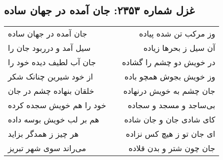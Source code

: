 \begin{center}
\section*{غزل شماره ۲۳۵۳: جان آمده در جهان ساده}
\label{sec:2353}
\begin{longtable}{l p{0.5cm} r}
جان آمده در جهان ساده
&&
وز مرکب تن شده پیاده
\\
سیل آمد و درربود جان را
&&
آن سیل ز بحرها زیاده
\\
جان آب لطیف دیده خود را
&&
در خویش دو چشم را گشاده
\\
از خود شیرین چنانک شکر
&&
وز خویش بجوش همچو باده
\\
خلقان بنهاده چشم در جان
&&
جان چشم به خویش درنهاده
\\
خود را هم خویش سجده کرده
&&
بی‌ساجد و مسجد و سجاده
\\
هم بر لب خویش بوسه داده
&&
کای شادی جان و جان شاده
\\
هر چیز ز همدگر بزاید
&&
ای جان تو ز هیچ کس نزاده
\\
می‌راند سوی شهر تبریز
&&
جان چون شتر و بدن قلاده
\\
\end{longtable}
\end{center}
